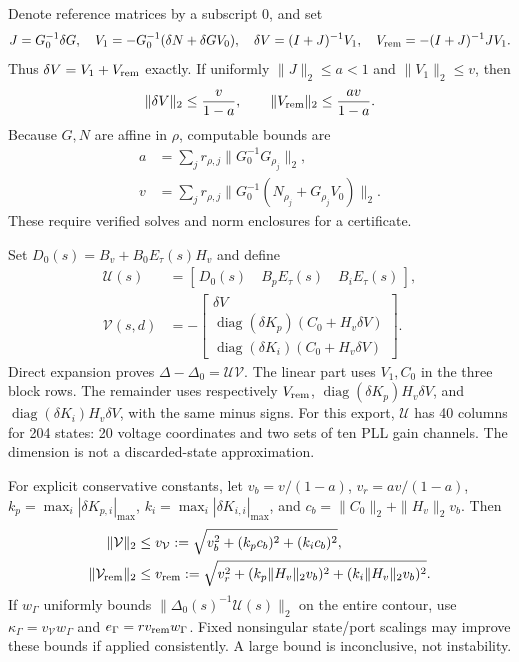 \documentclass[11pt]{article}
\newcommand{\diag}{\operatorname{diag}}
\begin{document}
Denote reference matrices by a subscript $0$, and set
\[
 J=G_0^{-1}\delta G,\quad
 V_1=-G_0^{-1}(\delta N+\delta G V_0),\quad
 \delta V=(I+J)^{-1}V_1,\quad
 V_{\rm rem}=- (I+J)^{-1}J V_1 .
\]
Thus $\delta V=V_1+V_{\rm rem}$ exactly. If uniformly
$\|J\|_2\le a<1$ and $\|V_1\|_2\le v$, then
\begin{equation}
 \|\delta V\|_2\le\frac{v}{1-a},\qquad
 \|V_{\rm rem}\|_2\le\frac{av}{1-a}. \label{eq:voltage-remainder}
\end{equation}
Because $G,N$ are affine in $\rho$, computable bounds are
\begin{align*}
a&=\sum_j r_{\rho,j}\|G_0^{-1}G_{\rho_j}\|_2,\\
v&=\sum_j r_{\rho,j}\|G_0^{-1}(N_{\rho_j}+G_{\rho_j}V_0)\|_2.
\end{align*}
These require verified solves and norm enclosures for a certificate.

Set $D_0(s)=B_v+B_0E_\tau(s)H_v$ and define
\begin{align}
 \mathcal U(s)&=[\,D_0(s)\quad B_pE_\tau(s)\quad B_iE_\tau(s)\,],\\
 \mathcal V(s,d)&=-
 \begin{bmatrix}
 \delta V\\
 \diag(\delta K_p)(C_0+H_v\delta V)\\
 \diag(\delta K_i)(C_0+H_v\delta V)
 \end{bmatrix}. \label{eq:physical-lowrank}
\end{align}
Direct expansion proves $\Delta-\Delta_0=\mathcal U\mathcal V$.
The linear part uses $V_1,C_0$ in the three block rows.
The remainder uses respectively
$V_{\rm rem}$, $\diag(\delta K_p)H_v\delta V$, and
$\diag(\delta K_i)H_v\delta V$, with the same minus signs.
For this export, $\mathcal U$ has 40 columns for 204 states:
20 voltage coordinates and two sets of ten PLL gain channels.
The dimension is not a discarded-state approximation.

For explicit conservative constants, let
$v_b=v/(1-a)$, $v_r=av/(1-a)$,
$k_p=\max_i|\delta K_{p,i}|_{\max}$,
$k_i=\max_i|\delta K_{i,i}|_{\max}$, and
$c_b=\|C_0\|_2+\|H_v\|_2v_b$.
Then
\begin{align*}
 \|\mathcal V\|_2&\le v_{\mathcal V}
   :=\sqrt{v_b^2+(k_pc_b)^2+(k_ic_b)^2},\\
 \|\mathcal V_{\rm rem}\|_2&\le v_{\rm rem}
   :=\sqrt{v_r^2+(k_p\|H_v\|_2v_b)^2+(k_i\|H_v\|_2v_b)^2}.
\end{align*}
If $w_\Gamma$ uniformly bounds
$\|\Delta_0(s)^{-1}\mathcal U(s)\|_2$ on the entire contour, use
$\kappa_\Gamma=v_{\mathcal V}w_\Gamma$ and
$e_\Gamma=r v_{\rm rem}w_\Gamma$.
Fixed nonsingular state/port scalings may improve these bounds if
applied consistently. A large bound is inconclusive, not instability.
\end{document}
